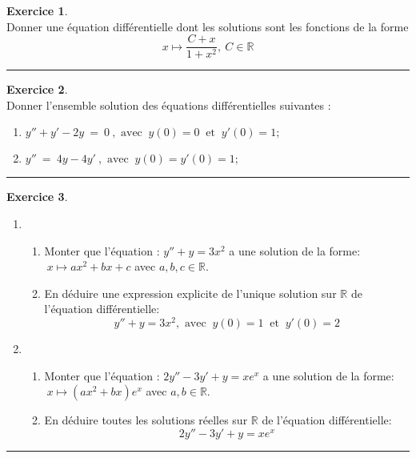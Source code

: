 \documentclass[10pt,a4paper]{article}
\newcommand{\R}{\mathbb{R}}
\theoremstyle{definition}
\theoremstyle{definition}
\newtheorem{exo}{Exercice}
\begin{document}
\begin{center}
\begin{minipage}[t]{0.47\linewidth}
\begin{exo}\quad\\
Donner une équation différentielle dont les solutions sont les fonctions de la forme 
$$x\longmapsto \dfrac{C + x}{1+ x^2}, \  C \in\R$$
\end{exo}
\begin{center}
\rule{1\linewidth}{0.6pt}
\end{center}

\end{minipage}	
\hfill\vrule\hfill
\begin{minipage}[t]{0.47\linewidth}
\raggedright

\begin{exo}\quad\\
Donner l'ensemble solution des équations différentielles suivantes :
\begin{enumerate}
\item$y'' + y'-2y \ = \ 0 \ , \text{ avec }  \  y(0)=0 \ \text{ et } \  y'(0) = 1; $
\item$y'' \ = \  4y -4y'\ , \text{ avec }  \   y(0)=y'(0)= 1; $
\end{enumerate}
\end{exo}
\begin{center}
\rule{1\linewidth}{0.6pt}
\end{center}

\begin{exo}\quad\\
\begin{enumerate}
\item
\begin{enumerate}
\item Monter que l'équation : $y'' + y = 3x^2$ a une solution de la forme: $ \ x \mapsto ax^2 +bx +c$ avec $a,b,c\in\R$.
\item En déduire une expression explicite de l'unique solution sur $\R$ de l'équation différentielle:  
$$y'' + y = 3x^2 , \text{ avec }  \  y(0)=1 \ \text{ et } \  y'(0) = 2 $$
\end{enumerate}
\item
\begin{enumerate}
\item Monter que l'équation : $2y'' -3y'+  y = xe^x$ a une solution de la forme:  $ \ x \mapsto \left(ax^2+bx\right)e^x$ \quad avec $a,b\in\R$.
\item En déduire toutes les solutions réelles sur $\R$ de l'équation différentielle:  
$$2y'' -3y'+  y = xe^x $$
\end{enumerate}
\end{enumerate}
\end{exo}
\begin{center}
\rule{1\linewidth}{0.6pt}
\end{center}


\end{minipage}
\end{center}
\end{document}
